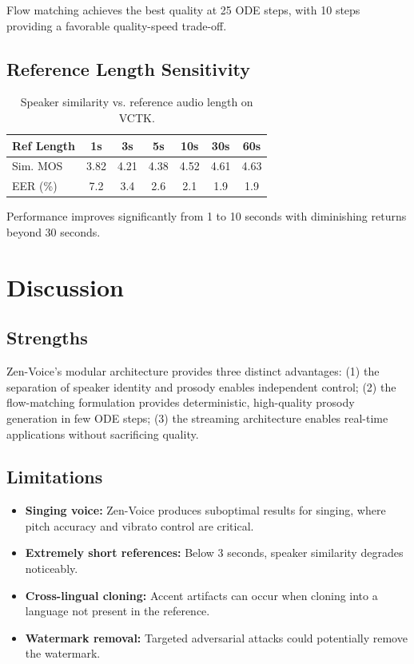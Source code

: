 \documentclass[11pt,a4paper]{article}
\begin{document}
Flow matching achieves the best quality at 25 ODE steps, with 10 steps providing a favorable quality-speed trade-off.

\subsection{Reference Length Sensitivity}

\begin{table}[t]
\centering
\caption{Speaker similarity vs. reference audio length on VCTK.}
\label{tab:ref_length}
\begin{tabular}{lcccccc}
\toprule
\textbf{Ref Length} & \textbf{1s} & \textbf{3s} & \textbf{5s} & \textbf{10s} & \textbf{30s} & \textbf{60s} \\
\midrule
Sim. MOS & 3.82 & 4.21 & 4.38 & 4.52 & 4.61 & 4.63 \\
EER (\%) & 7.2 & 3.4 & 2.6 & 2.1 & 1.9 & 1.9 \\
\bottomrule
\end{tabular}
\end{table}

Performance improves significantly from 1 to 10 seconds with diminishing returns beyond 30 seconds.

\section{Discussion}
\label{sec:discussion}

\subsection{Strengths}

Zen-Voice's modular architecture provides three distinct advantages: (1) the separation of speaker identity and prosody enables independent control; (2) the flow-matching formulation provides deterministic, high-quality prosody generation in few ODE steps; (3) the streaming architecture enables real-time applications without sacrificing quality.

\subsection{Limitations}

\begin{itemize}
    \item \textbf{Singing voice:} Zen-Voice produces suboptimal results for singing, where pitch accuracy and vibrato control are critical.
    \item \textbf{Extremely short references:} Below 3 seconds, speaker similarity degrades noticeably.
    \item \textbf{Cross-lingual cloning:} Accent artifacts can occur when cloning into a language not present in the reference.
    \item \textbf{Watermark removal:} Targeted adversarial attacks could potentially remove the watermark.
\end{itemize}
\end{document}

